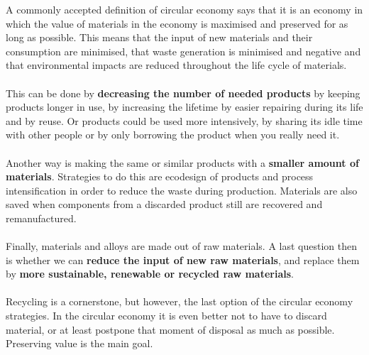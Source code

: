 \documentclass[../summary.tex]{subfiles}
\begin{document}
	A commonly accepted definition of circular economy says that it is an economy in which the value of materials in the economy is maximised and preserved for as long as possible. This means that the input of new materials and their consumption are minimised, that waste generation is minimised and negative and that environmental impacts are reduced throughout the life cycle of materials. 
	\\\\
	This can be done by \textbf{decreasing the number of needed products} by keeping products longer in use, by increasing the lifetime by easier repairing during its life and by reuse. Or products could be used more intensively, by sharing its idle time with other people or by only borrowing the product when you really need it.
	\\\\
	Another way is making the same or similar products with a \textbf{smaller amount of materials}. Strategies to do this are ecodesign of products and process intensification in order to reduce the waste during production. Materials are also saved when components from a discarded product still are recovered and remanufactured.
	\\\\
	Finally, materials and alloys are made out of raw materials. A last question then is whether we can \textbf{reduce the input of new raw materials}, and replace them by \textbf{more sustainable, renewable or recycled raw materials}. 
	\\\\
	Recycling is a cornerstone, but however, the last option of the circular economy strategies. In the circular economy it is even better not to have to discard material, or at least postpone that moment of disposal as much as possible. Preserving value is the main goal.
	
\end{document}
